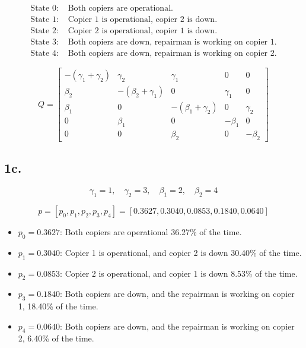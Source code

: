 \documentclass[12pt]{article}
\begin{document}
\[
\begin{aligned}
\text{State 0: } & \text{Both copiers are operational.} \\
\text{State 1: } & \text{Copier 1 is operational, copier 2 is down.} \\
\text{State 2: } & \text{Copier 2 is operational, copier 1 is down.} \\
\text{State 3: } & \text{Both copiers are down, repairman is working on copier 1.} \\
\text{State 4: } & \text{Both copiers are down, repairman is working on copier 2.}
\end{aligned}
\]

\[
Q =
\begin{bmatrix}
-(\gamma_1 + \gamma_2) & \gamma_2 & \gamma_1 & 0 & 0 \\
\beta_2 & -(\beta_2 + \gamma_1) & 0 & \gamma_1 & 0 \\
\beta_1 & 0 & -(\beta_1 + \gamma_2) & 0 & \gamma_2 \\
0 & \beta_1 & 0 & -\beta_1 & 0 \\
0 & 0 & \beta_2 & 0 & -\beta_2
\end{bmatrix}
\]

\subsection*{1c.}

\[
\gamma_1 = 1, \quad \gamma_2 = 3, \quad \beta_1 = 2, \quad \beta_2 = 4
\]

\[
p = [p_0, p_1, p_2, p_3, p_4] = [0.3627, 0.3040, 0.0853, 0.1840, 0.0640]
\]\newline

\begin{itemize}
    \item \(p_0 = 0.3627\): Both copiers are operational 36.27\% of the time.
    \item \(p_1 = 0.3040\): Copier 1 is operational, and copier 2 is down 30.40\% of the time.
    \item \(p_2 = 0.0853\): Copier 2 is operational, and copier 1 is down 8.53\% of the time.
    \item \(p_3 = 0.1840\): Both copiers are down, and the repairman is working on copier 1, 18.40\% of the time.
    \item \(p_4 = 0.0640\): Both copiers are down, and the repairman is working on copier 2, 6.40\% of the time.\newline
\end{itemize}
\end{document}
